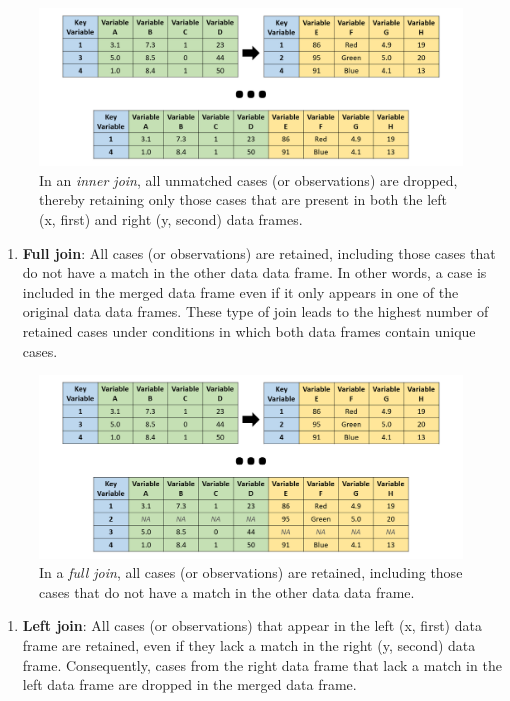 \documentclass[]{book}
\providecommand{\tightlist}{%
  \setlength{\itemsep}{0pt}\setlength{\parskip}{0pt}}
\begin{document}
\begin{figure}
\centering
\includegraphics{inner_join.png}
\caption{In an \emph{inner join}, all unmatched cases (or observations)
are dropped, thereby retaining only those cases that are present in both
the left (x, first) and right (y, second) data frames.}
\end{figure}

\begin{enumerate}
\def\labelenumi{\arabic{enumi}.}
\setcounter{enumi}{1}
\tightlist
\item
  \textbf{Full join}: All cases (or observations) are retained,
  including those cases that do not have a match in the other data data
  frame. In other words, a case is included in the merged data frame
  even if it only appears in one of the original data data frames. These
  type of join leads to the highest number of retained cases under
  conditions in which both data frames contain unique cases.
\end{enumerate}

\begin{figure}
\centering
\includegraphics{full_join.png}
\caption{In a \emph{full join}, all cases (or observations) are
retained, including those cases that do not have a match in the other
data data frame.}
\end{figure}

\begin{enumerate}
\def\labelenumi{\arabic{enumi}.}
\setcounter{enumi}{2}
\tightlist
\item
  \textbf{Left join}: All cases (or observations) that appear in the
  left (x, first) data frame are retained, even if they lack a match in
  the right (y, second) data frame. Consequently, cases from the right
  data frame that lack a match in the left data frame are dropped in the
  merged data frame.
\end{enumerate}
\end{document}
